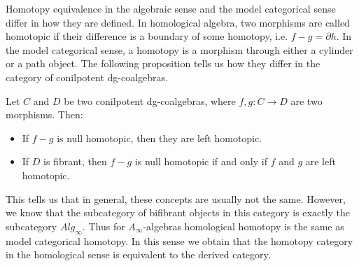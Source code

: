 \documentclass[../thesis.tex]{subfiles}
\begin{document}
    Homotopy equivalence in the algebraic sense and the model categorical sense differ in how they are defined. In homological algebra, two morphisms are called homotopic if their difference is a boundary of some homotopy, i.e. $f-g = \partial h$. In the model categorical sense, a homotopy is a morphism through either a cylinder or a path object. The following proposition tells us how they differ in the category of conilpotent dg-coalgebras.

    \begin{proposition}
        Let $C$ and $D$ be two conilpotent dg-coalgebras, where $f,g : C \rightarrow D$ are two morphisms. Then:
        \begin{itemize}
            \item If $f-g$ is null homotopic, then they are left homotopic.
            \item If $D$ is fibrant, then $f-g$ is null homotopic if and only if $f$ and $g$ are left homotopic.
        \end{itemize}
    \end{proposition}
    
    This tells us that in general, these concepts are usually not the same. However, we know that the subcategory of bifibrant objects in this category is exactly the subcategory $Alg_\infty$. Thus for $A_\infty$-algebras homological homotopy is the same as model categorical homotopy. In this sense we obtain that the homotopy category in the homological sense is equivalent to the derived category.
\end{document}
